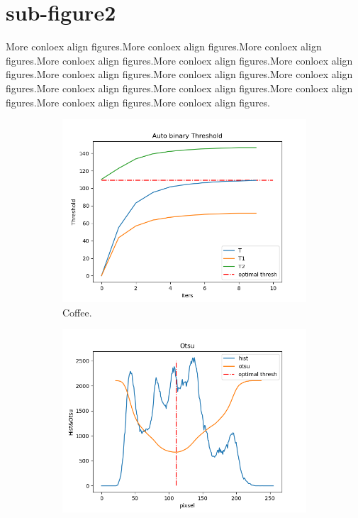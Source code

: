 \documentclass{article}
\begin{document}
\section{sub-figure2}
More conloex align figures.More conloex align figures.More conloex align figures.More conloex align figures.More conloex align figures.More conloex align figures.More conloex align figures.More conloex align figures.More conloex align figures.More conloex align figures.More conloex align figures.More conloex align figures.More conloex align figures.More conloex align figures.
\begin{figure}[htb!] %
  \centering
  \begin{subfigure}[b]{0.4\linewidth}
    \includegraphics[width=\linewidth]{autoThres.png}
     \caption{Coffee.}
  \end{subfigure}
  \begin{subfigure}[b]{0.4\linewidth}
    \includegraphics[width=\linewidth]{otsu.png}

\end{subfigure}
\end{figure}
\end{document}
